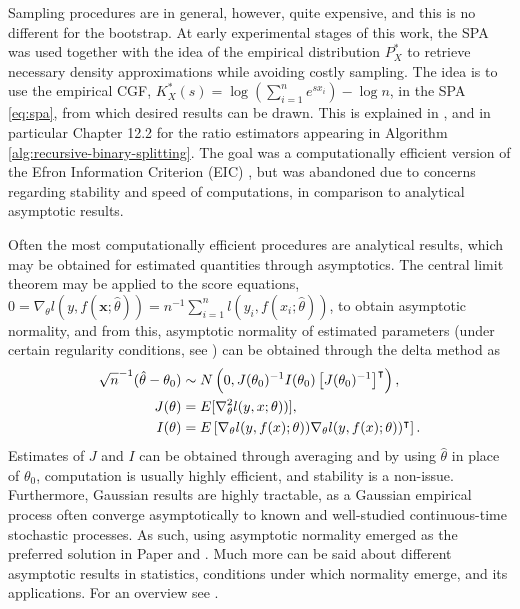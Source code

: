 Sampling procedures are in general, however, quite expensive, and this is no different for the bootstrap.
At early experimental stages of this work, the SPA was used together with the idea of the empirical distribution $P_X^*$ to retrieve necessary density approximations while avoiding costly sampling.
The idea is to use the empirical CGF, $K_X^*(s)=\log\left(\sum_{i=1}^{n} e^{sx_i}\right)-\log n$, in the SPA \eqref{eq:spa}, from which desired results can be drawn. 
This is explained in \citet[Chapter 14]{butler2007saddlepoint}, and in particular Chapter 12.2 for the ratio estimators appearing in Algorithm \ref{alg:recursive-binary-splitting}.
The goal was a computationally efficient version of the Efron Information Criterion (EIC) \citep{ishiguro1997bootstrapping}, but was abandoned due to concerns regarding stability and speed of computations, in comparison to analytical asymptotic results.

Often the most computationally efficient procedures are analytical results, which may be obtained for estimated quantities through asymptotics.
The central limit theorem may be applied to the score equations, $0=\nabla_\theta l(y,f(\mathbf{x};\hat{\theta}))=n^{-1}\sum_{i=1}^{n}l(y_i,f(x_i;\hat{\theta}))$, to obtain asymptotic normality, and from this, asymptotic normality of estimated parameters (under certain regularity conditions, see \citet{vanDerVaart}) can be obtained through the delta method as 
\begin{align}\label{eq:parameters-asymptotic-normality}
	\sqrt{n}^{-1}(\hat{\theta}-\theta_0) &\sim N\left( 0, J(\theta_0)^{-1}I(\theta_0)\left[J(\theta_0)^{-1}\right]^\intercal \right),\\
	J(\theta) &= E[\nabla_\theta^2 l(y,x;\theta))],\notag\\
	I(\theta) &= E\left[ \nabla_\theta l(y,f(x);\theta))\nabla_\theta l(y,f(x);\theta))^\intercal \right].\notag
\end{align}
Estimates of $J$ and $I$ can be obtained through averaging and by using $\hat\theta$ in place of $\theta_0$, computation is usually highly efficient, and stability is a non-issue.
Furthermore, Gaussian results are highly tractable, as a Gaussian empirical process often converge asymptotically to known and well-studied continuous-time stochastic processes.
As such, using asymptotic normality emerged as the preferred solution in Paper  and .
Much more can be said about different asymptotic results in statistics, conditions under which normality emerge, and its applications. For an overview see \citet{vanDerVaart}.


